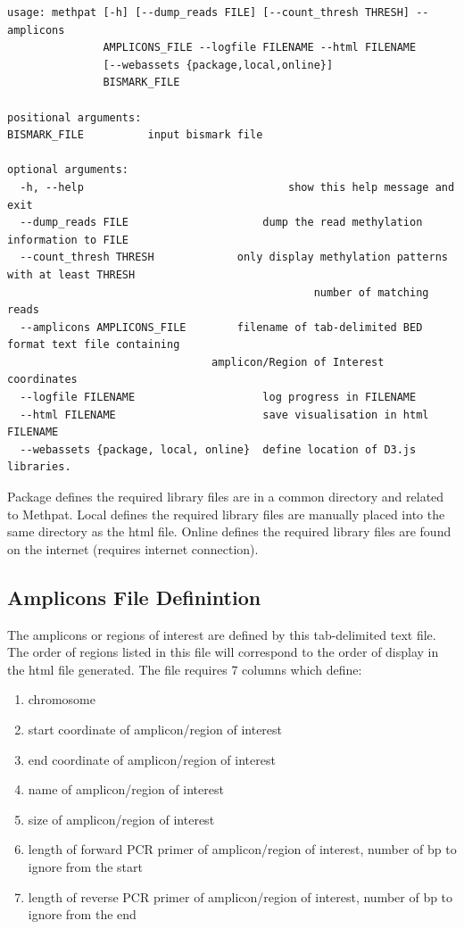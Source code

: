 \documentclass[11pt,a4paper]{article}
\begin{document}
\begin{verbatim}
usage: methpat [-h] [--dump_reads FILE] [--count_thresh THRESH] --amplicons
               AMPLICONS_FILE --logfile FILENAME --html FILENAME
               [--webassets {package,local,online}]
               BISMARK_FILE
               
positional arguments:
BISMARK_FILE          input bismark file

optional arguments:
  -h, --help            					show this help message and exit
  --dump_reads FILE     				dump the read methylation information to FILE
  --count_thresh THRESH				only display methylation patterns with at least THRESH
                        						number of matching reads
  --amplicons AMPLICONS_FILE		filename of tab-delimited BED format text file containing 
  								amplicon/Region of Interest coordinates
  --logfile FILENAME    				log progress in FILENAME
  --html FILENAME       				save visualisation in html FILENAME
  --webassets {package, local, online}	define location of D3.js libraries. 
\end{verbatim}
Package defines the required library files are in a common directory and related to Methpat.
Local defines the required library files are manually placed into the same directory as the html file.
Online defines the required library files are found on the internet (requires internet connection).

\subsection{Amplicons File Definintion}
The amplicons or regions of interest are defined by this tab-delimited text file. The order of regions listed in this file will correspond to the order of display in the html file generated.
The file requires 7 columns which define:

\begin{enumerate}
\item{chromosome}
\item{start coordinate of amplicon/region of interest}
\item{end coordinate of amplicon/region of interest}
\item{name of amplicon/region of interest}
\item{size of amplicon/region of interest}
\item{length of forward PCR primer of amplicon/region of interest, number of bp to ignore from the start}
\item{length of reverse PCR primer of amplicon/region of interest, number of bp to ignore from the end}
\end{enumerate}
\end{document}

